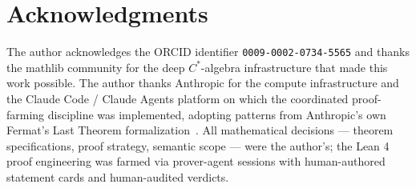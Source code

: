 \documentclass[11pt,a4paper]{article}
\theoremstyle{plain}
\theoremstyle{definition}
\begin{document}
\section*{Acknowledgments}

The author acknowledges the ORCID identifier \texttt{0009-0002-0734-5565} and thanks the mathlib community for the deep $C^{\ast}$-algebra infrastructure that made this work possible. The author thanks Anthropic for the compute infrastructure and the Claude Code / Claude Agents platform on which the coordinated proof-farming discipline was implemented, adopting patterns from Anthropic's own Fermat's Last Theorem formalization~\cite{anthropic_flt_2026}. All mathematical decisions --- theorem specifications, proof strategy, semantic scope --- were the author's; the Lean 4 proof engineering was farmed via prover-agent sessions with human-authored statement cards and human-audited verdicts.
\end{document}
